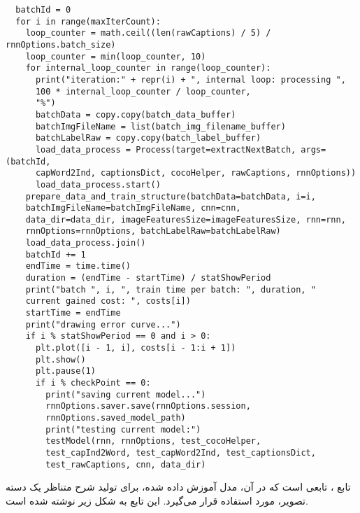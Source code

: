 \begin{latin}
\begin{verbatim}
  batchId = 0
  for i in range(maxIterCount):
    loop_counter = math.ceil((len(rawCaptions) / 5) / rnnOptions.batch_size)
    loop_counter = min(loop_counter, 10)
    for internal_loop_counter in range(loop_counter):
      print("iteration:" + repr(i) + ", internal loop: processing ",
      100 * internal_loop_counter / loop_counter,
      "%")
      batchData = copy.copy(batch_data_buffer)
      batchImgFileName = list(batch_img_filename_buffer)
      batchLabelRaw = copy.copy(batch_label_buffer)
      load_data_process = Process(target=extractNextBatch, args=(batchId, 
      capWord2Ind, captionsDict, cocoHelper, rawCaptions, rnnOptions))
      load_data_process.start()
    prepare_data_and_train_structure(batchData=batchData, i=i, 
    batchImgFileName=batchImgFileName, cnn=cnn,
    data_dir=data_dir, imageFeaturesSize=imageFeaturesSize, rnn=rnn,
    rnnOptions=rnnOptions, batchLabelRaw=batchLabelRaw)
    load_data_process.join()
    batchId += 1
    endTime = time.time()
    duration = (endTime - startTime) / statShowPeriod
    print("batch ", i, ", train time per batch: ", duration, " 
    current gained cost: ", costs[i])
    startTime = endTime
    print("drawing error curve...")
    if i % statShowPeriod == 0 and i > 0:
      plt.plot([i - 1, i], costs[i - 1:i + 1])
      plt.show()
      plt.pause(1)
      if i % checkPoint == 0:
        print("saving current model...")
        rnnOptions.saver.save(rnnOptions.session, 
        rnnOptions.saved_model_path)
        print("testing current model:")
        testModel(rnn, rnnOptions, test_cocoHelper, 
        test_capInd2Word, test_capWord2Ind, test_captionsDict,
        test_rawCaptions, cnn, data_dir)

\end{verbatim}
\end{latin}

تابع ، تابعی است که در آن، مدل آموزش داده شده، برای تولید شرح متناظر یک دسته تصویر، مورد استفاده قرار می‌گیرد. این تابع به شکل زیر نوشته شده است.

